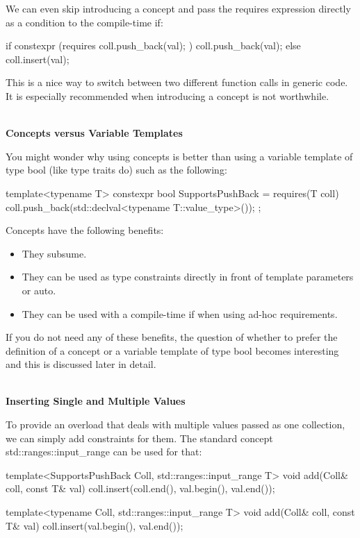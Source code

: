 We can even skip introducing a concept and pass the requires expression directly as a condition to the compile-time if:

\begin{cpp}
if constexpr (requires { coll.push_back(val); }) {
	coll.push_back(val);
}
else {
	coll.insert(val);
}
\end{cpp}

This is a nice way to switch between two different function calls in generic code. It is especially recommended when introducing a concept is not worthwhile.

\noindent
\hspace*{\fill} \\ %
\textbf{Concepts versus Variable Templates}

You might wonder why using concepts is better than using a variable template of type bool (like type traits do) such as the following:

\begin{cpp}
template<typename T>
constexpr bool SupportsPushBack = requires(T coll) {
	coll.push_back(std::declval<typename T::value_type>());
};
\end{cpp}

Concepts have the following benefits:

\begin{itemize}
\item
They subsume.

\item
They can be used as type constraints directly in front of template parameters or auto.

\item
They can be used with a compile-time if when using ad-hoc requirements.
\end{itemize}

If you do not need any of these benefits, the question of whether to prefer the definition of a concept or a variable template of type bool becomes interesting and this is discussed later in detail.

\noindent
\hspace*{\fill} \\ %
\textbf{Inserting Single and Multiple Values}

To provide an overload that deals with multiple values passed as one collection, we can simply add constraints for them. The standard concept std::ranges::input\_range can be used for that:

\begin{cpp}
template<SupportsPushBack Coll, std::ranges::input_range T>
void add(Coll& coll, const T& val)
{
	coll.insert(coll.end(), val.begin(), val.end());
}

template<typename Coll, std::ranges::input_range T>
void add(Coll& coll, const T& val)
{
	coll.insert(val.begin(), val.end());
}
\end{cpp}

